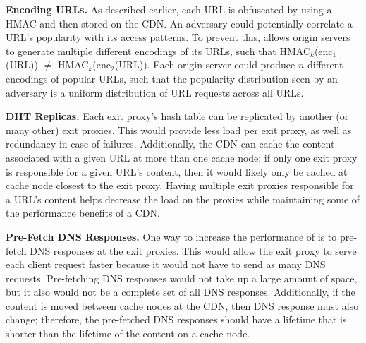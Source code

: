 \textbf{Encoding URLs.}
As described earlier, each URL is obfuscated by using a HMAC and then stored on the CDN.  An adversary 
could potentially correlate a URL's popularity with its access patterns.  To prevent this, \system{} allows 
origin servers to generate multiple different encodings of its URLs, such that HMAC$_k$(enc$_1$(URL)) $\neq$ 
HMAC$_k$(enc$_2$(URL)).  Each origin server could produce $n$ different encodings of popular URLs, such that 
the popularity distribution seen by an adversary is a uniform distribution of URL requests across all URLs.  

\textbf{DHT Replicas.}
Each exit proxy's hash table can be replicated by another (or many other) exit proxies.  This 
would provide less load per exit proxy, as well as redundancy in case of failures.  Additionally, 
the CDN can cache the content associated with a given URL at more than one cache
node;
if only one exit proxy is responsible for a given URL's content, then it would likely only be cached at 
cache node closest to the exit proxy.  Having multiple exit proxies responsible for a URL's content 
helps decrease the load on the proxies while maintaining some of the performance benefits of a CDN.


\textbf{Pre-Fetch DNS Responses.} 
One way to increase the performance of \system{} is to pre-fetch DNS responses at 
the exit proxies.  This would allow the exit proxy to serve each client request faster 
because it would not have to send as many DNS requests.  Pre-fetching DNS responses would 
not take up a large amount of space, but it also would not be a complete set of all DNS 
responses.  Additionally, if the content is moved between cache nodes at the CDN, then DNS 
response must also change; therefore, the pre-fetched DNS responses should have a lifetime 
that is shorter than the lifetime of the content on a cache node.

